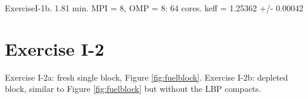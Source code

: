 \documentclass[11pt,letterpaper]{article}
\begin{document}


ExerciseI-1b. 1.81 min. MPI = 8, OMP = 8: 64 cores.
keff = 1.25362 +/- 0.00042

\section{Exercise I-2}

Exercise I-2a: fresh single block, Figure \ref{fig:fuelblock}.
Exercise I-2b: depleted block, similar to Figure \ref{fig:fuelblock} but without the LBP compacts.

\pagebreak


\end{document}
